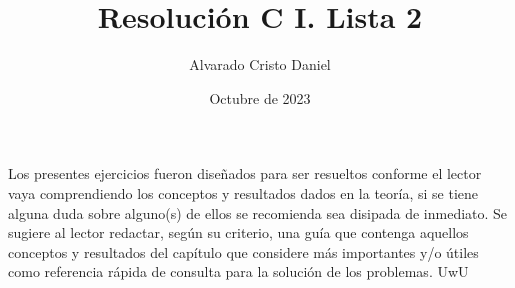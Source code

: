 \documentclass[12pt]{article}
\begin{document}
\title{Resolución C I. Lista 2}
\author{Alvarado Cristo Daniel}
\date{Octubre de 2023}
\maketitle

Los presentes ejercicios fueron diseñados para ser resueltos conforme el lector vaya comprendiendo los conceptos y resultados dados en la teoría, si se tiene alguna duda sobre alguno(s) de ellos se recomienda sea disipada de inmediato. Se sugiere al lector redactar, según su criterio, una guía que contenga aquellos conceptos y resultados del capítulo que considere más importantes y/o útiles como referencia
rápida de consulta para la solución de los problemas. UwU

\renewcommand{\labelenumi}{\textbf{2.\theenumi.}}
\renewcommand{\labelenumii}{\textbf{\Roman{enumii}.}}
\providecommand{\abs}[1]{\left| #1 \right|}
\def\proof{\textit{Solución:}\\}
\end{document}
